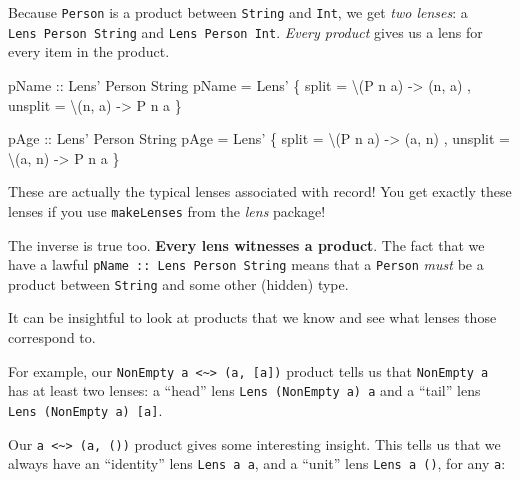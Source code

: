 \documentclass[]{article}
\newenvironment{Shaded}{}{}
\newcommand{\DataTypeTok}[1]{\textcolor[rgb]{0.56,0.13,0.00}{#1}}
\newcommand{\FunctionTok}[1]{\textcolor[rgb]{0.02,0.16,0.49}{#1}}
\newcommand{\NormalTok}[1]{#1}
\newcommand{\OtherTok}[1]{\textcolor[rgb]{0.00,0.44,0.13}{#1}}
\begin{document}
Because \texttt{Person} is a product between \texttt{String} and \texttt{Int},
we get \emph{two lenses}: a \texttt{Lens\textquotesingle{}\ Person\ String} and
\texttt{Lens\textquotesingle{}\ Person\ Int}. \emph{Every product} gives us a
lens for every item in the product.

\begin{Shaded}
\begin{Highlighting}[]
\OtherTok{pName ::} \DataTypeTok{Lens'} \DataTypeTok{Person} \DataTypeTok{String}
\NormalTok{pName }\FunctionTok{=} \DataTypeTok{Lens'}\NormalTok{ \{ split   }\FunctionTok{=}\NormalTok{ \textbackslash{}(}\DataTypeTok{P}\NormalTok{ n a) }\OtherTok{->}\NormalTok{ (n, a)}
\NormalTok{              , unsplit }\FunctionTok{=}\NormalTok{ \textbackslash{}(n, a)  }\OtherTok{->} \DataTypeTok{P}\NormalTok{ n a}
\NormalTok{              \}}

\OtherTok{pAge ::} \DataTypeTok{Lens'} \DataTypeTok{Person} \DataTypeTok{String}
\NormalTok{pAge }\FunctionTok{=} \DataTypeTok{Lens'}\NormalTok{ \{ split   }\FunctionTok{=}\NormalTok{ \textbackslash{}(}\DataTypeTok{P}\NormalTok{ n a) }\OtherTok{->}\NormalTok{ (a, n)}
\NormalTok{             , unsplit }\FunctionTok{=}\NormalTok{ \textbackslash{}(a, n)  }\OtherTok{->} \DataTypeTok{P}\NormalTok{ n a}
\NormalTok{             \}}
\end{Highlighting}
\end{Shaded}

These are actually the typical lenses associated with record! You get exactly
these lenses if you use \texttt{makeLenses} from the \emph{lens} package!

The inverse is true too. \textbf{Every lens witnesses a product}. The fact that
we have a lawful \texttt{pName\ ::\ Lens\textquotesingle{}\ Person\ String}
means that a \texttt{Person} \emph{must} be a product between \texttt{String}
and some other (hidden) type.

It can be insightful to look at products that we know and see what lenses those
correspond to.

For example, our
\texttt{NonEmpty\ a\ \textless{}\textasciitilde{}\textgreater{}\ (a,\ {[}a{]})}
product tells us that \texttt{NonEmpty\ a} has at least two lenses: a ``head''
lens \texttt{Lens\textquotesingle{}\ (NonEmpty\ a)\ a} and a ``tail'' lens
\texttt{Lens\textquotesingle{}\ (NonEmpty\ a)\ {[}a{]}}.

Our \texttt{a\ \textless{}\textasciitilde{}\textgreater{}\ (a,\ ())} product
gives some interesting insight. This tells us that we always have an
``identity'' lens \texttt{Lens\textquotesingle{}\ a\ a}, and a ``unit'' lens
\texttt{Lens\textquotesingle{}\ a\ ()}, for any \texttt{a}:
\end{document}

